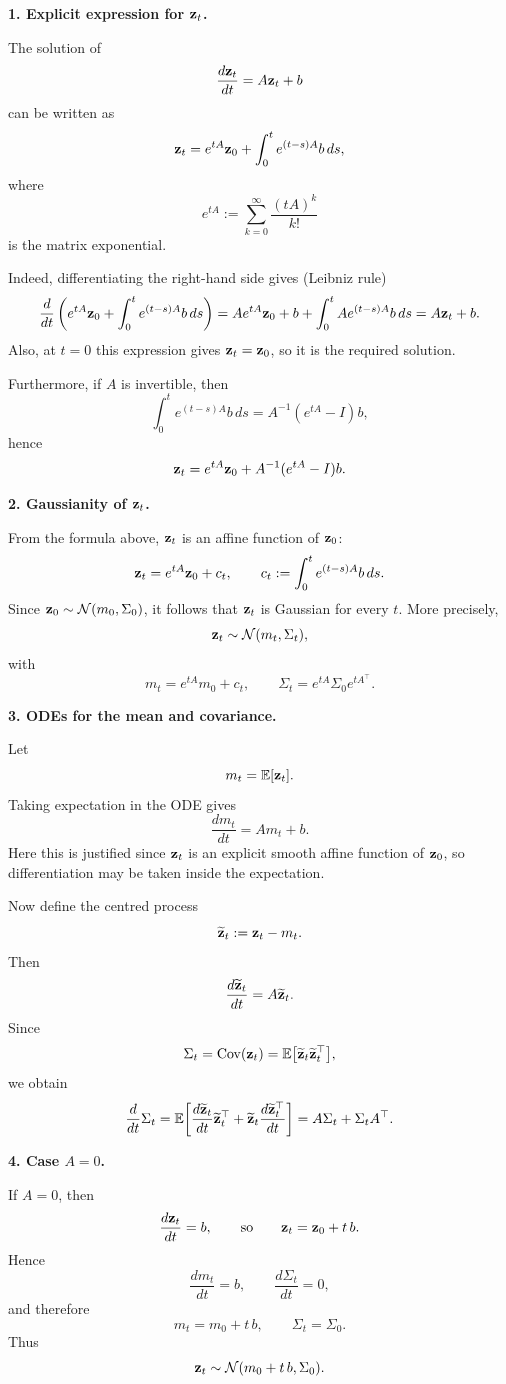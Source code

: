 \begin{solution}

\textbf{1. Explicit expression for \({ \mathbf{z}}_t\).}

The solution of
\[
\frac{d{ \mathbf{z}}_t}{dt}=A{ \mathbf{z}}_t+b
\]
can be written as
\[
{ \mathbf{z}}_t = e^{tA}{ \mathbf{z}}_0 + \int_0^t e^{(t-s)A}b\,ds,
\]
where
\[
e^{tA}:=\sum_{k=0}^\infty \frac{(tA)^k}{k!}
\]
is the matrix exponential.

Indeed, differentiating the right-hand side gives (Leibniz rule)
\[
\frac{d}{dt}\left(e^{tA}{ \mathbf{z}}_0 + \int_0^t e^{(t-s)A}b\,ds\right)
=
Ae^{tA}{ \mathbf{z}}_0 + b + \int_0^t A e^{(t-s)A}b\,ds
=
A{ \mathbf{z}}_t+b.
\]
Also, at \(t=0\) this expression gives \({ \mathbf{z}}_t={ \mathbf{z}}_0\), so it is the required solution.

Furthermore, if \(A\) is invertible, then
\[
\int_0^t e^{(t-s)A}b\,ds
=
A^{-1}(e^{tA}-I)b,
\]
hence
\[
{ \mathbf{z}}_t = e^{tA}{ \mathbf{z}}_0 + A^{-1}(e^{tA}-I)b.
\]

\bigskip

\textbf{2. Gaussianity of \({ \mathbf{z}}_t\).}

From the formula above, \({ \mathbf{z}}_t\) is an affine function of \({ \mathbf{z}}_0\):
\[
{ \mathbf{z}}_t = e^{tA}{ \mathbf{z}}_0 + c_t,
\qquad
c_t:=\int_0^t e^{(t-s)A}b\,ds.
\]
Since \({ \mathbf{z}}_0\sim \mathcal N(m_0,\Sigma_0)\), it follows that \({ \mathbf{z}}_t\) is Gaussian for every \(t\). More precisely,
\[
{ \mathbf{z}}_t \sim \mathcal N(m_t,\Sigma_t),
\]
with
\[
m_t = e^{tA}m_0 + c_t,
\qquad
\Sigma_t = e^{tA}\Sigma_0 e^{tA^\top}.
\]

\bigskip

\textbf{3. ODEs for the mean and covariance.}

Let
\[
m_t=\mathbb E[{ \mathbf{z}}_t].
\]
Taking expectation in the ODE gives
\[
\frac{dm_t}{dt}=Am_t+b.
\]
Here this is justified since \({ \mathbf{z}}_t\) is an explicit smooth affine function of \({ \mathbf{z}}_0\), so differentiation may be taken inside the expectation.

Now define the centred process
\[
\widetilde{{ \mathbf{z}}}_t := { \mathbf{z}}_t-m_t.
\]
Then
\[
\frac{d\widetilde{{ \mathbf{z}}}_t}{dt}
=
A\widetilde{{ \mathbf{z}}}_t.
\]
Since
\[
\Sigma_t=\mathrm{Cov}({ \mathbf{z}}_t)=\mathbb E\bigl[\widetilde{{ \mathbf{z}}}_t\widetilde{{ \mathbf{z}}}_t^\top\bigr],
\]
we obtain
\[
\frac{d}{dt}\Sigma_t
=
\mathbb E\!\left[\frac{d\widetilde{{ \mathbf{z}}}_t}{dt}\widetilde{{ \mathbf{z}}}_t^\top
+
\widetilde{{ \mathbf{z}}}_t\frac{d\widetilde{{ \mathbf{z}}}_t^\top}{dt}\right]
=
A\Sigma_t+\Sigma_tA^\top.
\]

\bigskip

\textbf{4. Case \(A=0\).}

If \(A=0\), then
\[
\frac{d{ \mathbf{z}}_t}{dt}=b,
\qquad\text{so}\qquad
{ \mathbf{z}}_t={ \mathbf{z}}_0+t\,b.
\]
Hence
\[
\frac{dm_t}{dt}=b,
\qquad
\frac{d\Sigma_t}{dt}=0,
\]
and therefore
\[
m_t=m_0+t\,b,
\qquad
\Sigma_t=\Sigma_0.
\]
Thus
\[
{ \mathbf{z}}_t \sim \mathcal N(m_0+t\,b,\Sigma_0).
\]

\end{solution}

